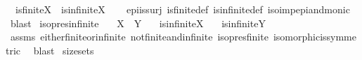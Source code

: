 \begin{isabellebody}
\ \ {\isachardoublequoteopen}{\isasymnot}{\isacharparenleft}{\kern0pt}is{\isacharunderscore}{\kern0pt}finite{\isacharparenleft}{\kern0pt}X{\isacharparenright}{\kern0pt}\ {\isasymand}\ is{\isacharunderscore}{\kern0pt}infinite{\isacharparenleft}{\kern0pt}X{\isacharparenright}{\kern0pt}{\isacharparenright}{\kern0pt}{\isachardoublequoteclose}\isanewline
%
\isadelimproof
\ \ %
\endisadelimproof
%
\isatagproof
{}\isamarkupfalse%
\ epi{\isacharunderscore}{\kern0pt}is{\isacharunderscore}{\kern0pt}surj\ is{\isacharunderscore}{\kern0pt}finite{\isacharunderscore}{\kern0pt}def\ is{\isacharunderscore}{\kern0pt}infinite{\isacharunderscore}{\kern0pt}def\ iso{\isacharunderscore}{\kern0pt}imp{\isacharunderscore}{\kern0pt}epi{\isacharunderscore}{\kern0pt}and{\isacharunderscore}{\kern0pt}monic\ \isamarkupfalse%
\ blast%
\endisatagproof
{\isafoldproof}%
%
\isadelimproof
\isanewline
%
\endisadelimproof
\isanewline
{}\isamarkupfalse%
\ iso{\isacharunderscore}{\kern0pt}pres{\isacharunderscore}{\kern0pt}infinite{\isacharcolon}{\kern0pt}\isanewline
\ \ \ {\isachardoublequoteopen}X\ {\isasymcong}\ Y{\isachardoublequoteclose}\isanewline
\ \ \ {\isachardoublequoteopen}is{\isacharunderscore}{\kern0pt}infinite{\isacharparenleft}{\kern0pt}X{\isacharparenright}{\kern0pt}{\isachardoublequoteclose}\isanewline
\ \ \ {\isachardoublequoteopen}is{\isacharunderscore}{\kern0pt}infinite{\isacharparenleft}{\kern0pt}Y{\isacharparenright}{\kern0pt}{\isachardoublequoteclose}\isanewline
%
\isadelimproof
\ \ %
\endisadelimproof
%
\isatagproof
{}\isamarkupfalse%
\ assms\ either{\isacharunderscore}{\kern0pt}finite{\isacharunderscore}{\kern0pt}or{\isacharunderscore}{\kern0pt}infinite\ not{\isacharunderscore}{\kern0pt}finite{\isacharunderscore}{\kern0pt}and{\isacharunderscore}{\kern0pt}infinite\ iso{\isacharunderscore}{\kern0pt}pres{\isacharunderscore}{\kern0pt}finite\ isomorphic{\isacharunderscore}{\kern0pt}is{\isacharunderscore}{\kern0pt}symmetric\ \isamarkupfalse%
\ blast%
\endisatagproof
{\isafoldproof}%
%
\isadelimproof
\isanewline
%
\endisadelimproof
\isanewline
{}\isamarkupfalse%
\ size{\isacharunderscore}{\kern0pt}{}{\isacharunderscore}{\kern0pt}sets{\isacharcolon}{\kern0pt}\isanewline

\end{isabellebody}
